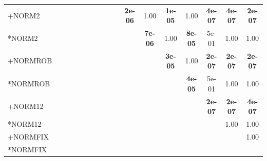 \begin{table}[t]
{\begin{tabular}{lcccccccccccccccc}
+NORM2 &  &  &  &  &  &  &  &  &  & \textbf{2e-06} & 1.00 & \textbf{1e-05} & 1.00 & \textbf{4e-07} & \textbf{4e-07} & \textbf{2e-07} \\
*NORM2 &  &  &  &  &  &  &  &  &  &  & \textbf{7e-06} & 1.00 & \textbf{8e-05} & 5e-01 & 1.00 & 1.00 \\
+NORMROB &  &  &  &  &  &  &  &  &  &  &  & \textbf{3e-05} & 1.00 & \textbf{2e-07} & \textbf{2e-07} & \textbf{2e-07} \\
*NORMROB &  &  &  &  &  &  &  &  &  &  &  &  & \textbf{4e-05} & 5e-01 & 1.00 & 1.00 \\
+NORM12 &  &  &  &  &  &  &  &  &  &  &  &  &  & \textbf{2e-07} & \textbf{2e-07} & \textbf{4e-07} \\
*NORM12 &  &  &  &  &  &  &  &  &  &  &  &  &  &  & 1.00 & 1.00 \\
+NORMFIX &  &  &  &  &  &  &  &  &  &  &  &  &  &  &  & 1.00 \\
*NORMFIX &  &  &  &  &  &  &  &  &  &  &  &  &  &  &  &  \\
\bottomrule
\end{tabular}
}
\end{table}

